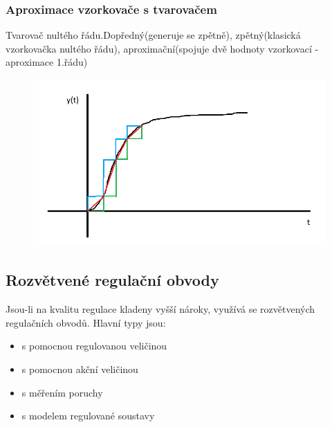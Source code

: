 \subsubsection*{Aproximace vzorkovače s tvarovačem}
Tvarovač nultého řádu.Dopředný(generuje se zpětně), zpětný(klasická vzorkovačka nultého řádu), aproximační(spojuje dvě hodnoty vzorkovací - aproximace 1.řádu)
\begin{figure}[H]
    \includegraphics*[scale = 1]{images/tvarovace.png}
\end{figure}

\subsection*{Rozvětvené regulační obvody}
Jsou-li na kvalitu regulace kladeny vyšší nároky, využívá se rozvětvených regulačních obvodů.
Hlavní typy jsou:
\begin{itemize}
    \item s pomocnou regulovanou veličinou
    \item s pomocnou akční veličinou
    \item s měřením poruchy
    \item s modelem regulované soustavy
\end{itemize}

